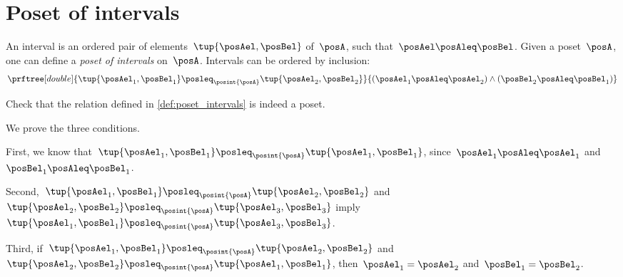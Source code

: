 \section{Poset of intervals}
\begin{definition}
  \label{def:poset_intervals}
  An interval is an ordered pair of elements~$\tup{\posAel,\posBel}$ of~$\posA$, such that~$\posAel \posAleq \posBel$. Given a poset~$\posA$, one can define a \emph{poset of intervals} on~$\posA$.
  Intervals can be ordered by inclusion:
  \begin{equation}
    \prftree[double]{\tup{\posAel_1,\posBel_1}\posleq_{\posint{\posA}}\tup{\posAel_2,\posBel_2} }{ (\posAel_1\posAleq \posAel_2)\wedge (\posBel_2\posAleq \posBel_1)}
  \end{equation}
\end{definition}

\begin{exercise}
Check that the relation defined in \cref{def:poset_intervals} is indeed a poset.
\end{exercise}
\begin{solution}
  We prove the three conditions.
  \begin{compactitem}
    \item First, we know that~$\tup{\posAel_1,\posBel_1}\posleq_{\posint{\posA}}\tup{\posAel_1,\posBel_1}$, since~$\posAel_1\posAleq \posAel_1$ and~$\posBel_1\posAleq \posBel_1$.
    \item Second,~$\tup{\posAel_1,\posBel_1}\posleq_{\posint{\posA}}\tup{\posAel_2,\posBel_2}$ and~$\tup{\posAel_2,\posBel_2}\posleq_{\posint{\posA}}\tup{\posAel_3,\posBel_3}$ imply~$\tup{\posAel_1,\posBel_1}\posleq_{\posint{\posA}}\tup{\posAel_3,\posBel_3}$.
    \item Third, if~$\tup{\posAel_1,\posBel_1}\posleq_{\posint{\posA}}\tup{\posAel_2,\posBel_2}$ and~$\tup{\posAel_2,\posBel_2}\posleq_{\posint{\posA}}\tup{\posAel_1,\posBel_1}$, then~$\posAel_1=\posAel_2$ and~$\posBel_1=\posBel_2$.
  \end{compactitem}
\end{solution}
